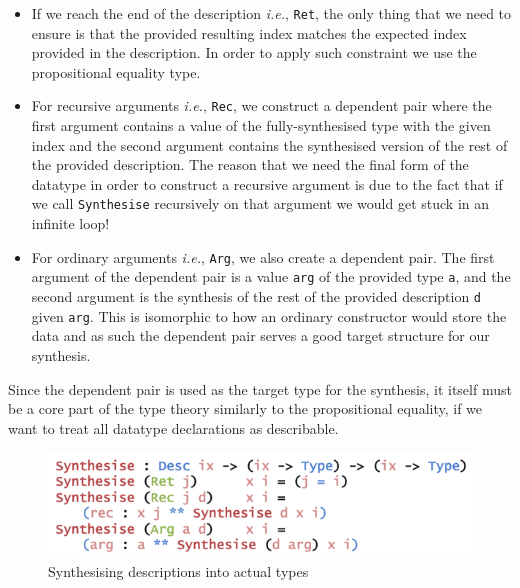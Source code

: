 \documentclass{ituthesis}
\newcommand{\ttconstructor}[1]{\textcolor{constructor-color}{\texttt{#1}}}
\newcommand{\ttdec}[1]{\textcolor{declared-var-color}{\texttt{#1}}}
\newcommand{\ttvar}[1]{\textcolor{local-var-color}{\texttt{#1}}}
\theoremstyle{break}
\begin{document}
\begin{itemize}
  \item If we reach the end of the description \textit{i.e.}, \ttconstructor{Ret}, the only thing that we need to ensure is that the provided resulting index matches the expected index provided in the description. In order to apply such constraint we use the propositional equality type.
  \item For recursive arguments \textit{i.e.}, \ttconstructor{Rec}, we construct a dependent pair where the first argument contains a value of the fully-synthesised type with the given index and the second argument contains the synthesised version of the rest of the provided description. The reason that we need the final form of the datatype in order to construct a recursive argument is due to the fact that if we call \ttdec{Synthesise} recursively on that argument we would get stuck in an infinite loop!
  \item For ordinary arguments \textit{i.e.}, \ttconstructor{Arg}, we also create a dependent pair. The first argument of the dependent pair is a value \ttvar{arg} of the provided type \ttvar{a}, and the second argument is the synthesis of the rest of the provided description \ttvar{d} given \ttvar{arg}. This is isomorphic to how an ordinary constructor would store the data and as such the dependent pair serves a good target structure for our synthesis.
\end{itemize}
Since the dependent pair is used as the target type for the synthesis, it itself must be a core part of the type theory similarly to the propositional equality, if we want to treat all datatype declarations as describable.

\begin{figure}[ht]
\begin{center}
    \includegraphics[scale=0.5]{Figures/SynthesisingData.png}
\end{center}
\caption{Synthesising descriptions into actual types}
\label{fig:synthdata}
\end{figure}
\end{document}
